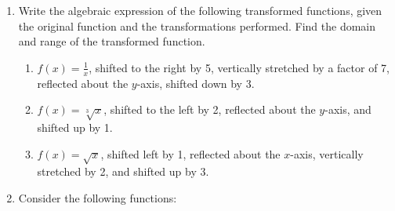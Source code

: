 \documentclass{ximera}
\newcommand{\usualgrid}[4]{
  axis lines=middle,
  xlabel=$$,
  xlabel style={at=(current axis.right of origin), anchor=west},
  ylabel=$$,
  ylabel style={at=(current axis.above origin), anchor=south},
  xmin=#1,
  xmax=#2,
  ymin=#3,
  ymax=#4,
  xtick={#1,...,#2},
  ytick={#3,...,#4},
  xticklabels={,,},
  yticklabels={,,},
  grid=major,
}
\begin{document}
\begin{enumerate}
\item Write the algebraic expression of the following transformed functions, given the original function and the transformations performed. Find the domain and range of the transformed function.  
\begin{enumerate}
\item $\displaystyle f(x)=\frac{1}{x}$, shifted to the right by 5, vertically stretched by a factor of 7, reflected about the $y$-axis, shifted down by 3. 
\item $f(x)=\sqrt[3]{x}$, shifted to the left by 2, reflected about the $y$-axis, and shifted up by 1.
\item $f(x)=\sqrt{x}$, shifted left by 1, reflected about the $x$-axis, vertically stretched by 2, and shifted up by 3.
\end{enumerate} 




\item Consider the following functions:

\begin{center}
\end{center}


\end{enumerate}
\end{document}
